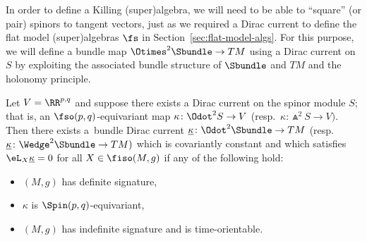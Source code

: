 In order to define a Killing (super)algebra, we will need to be able to ``square'' (or pair) spinors to tangent vectors, just as we required a Dirac current to define the flat model (super)algebras $\fs$ in Section~\ref{sec:flat-model-algs}. For this purpose, we will define a bundle map $\Otimes^2\Sbundle\to TM$ using a Dirac current on $S$ by exploiting the associated bundle structure of $\Sbundle$ and $TM$ and the holonomy principle.

\begin{Lemma}\label{lemma:bundle-dirac-current-exist}
	Let $V=\RR^{p,q}$ and suppose there exists a Dirac current on the spinor module $S$; that is, an $\fso(p,q)$-equivariant map $\kappa\colon \Odot^2S\to V$ {\rm(}resp.\ $\kappa\colon \Wedge^2S\to V)$. Then there exists a~bundle Dirac current $\underline\kappa\colon \Odot^2\Sbundle\to TM$ {\rm(}resp.\ $\underline\kappa\colon \Wedge^2\Sbundle\to TM)$ which is covariantly constant and which satisfies $\eL_X\underline\kappa=0$ for all $X\in\fiso(M,g)$ if any of the following hold:
	\begin{itemize}\itemsep=0pt
	\item $(M,g)$ has definite signature,
	\item $\kappa$ is $\Spin(p,q)$-equivariant,
	\item $(M,g)$ has indefinite signature and is time-orientable.
	\end{itemize}
\end{Lemma}

